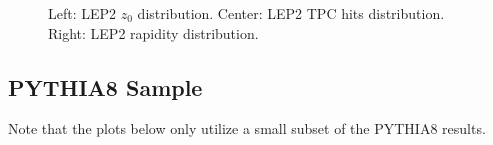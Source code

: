 \begin{figure}[H]
\centering
{}\hfill
{}\hfill %
\hfill %
\caption{Left: LEP2 $z_0$ distribution. Center: LEP2 TPC hits distribution. Right: LEP2 rapidity distribution.}
\end{figure}


\subsection{PYTHIA8 Sample}

Note that the plots below only utilize a small subset of the PYTHIA8 results.

